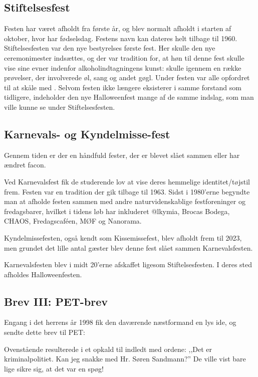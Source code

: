 \subsection{Stiftelsesfest}
Festen har været afholdt fra \TKETs første år, og blev normalt afholdt i starten af oktober, hvor \TKET har fødselsdag. Festens navn kan dateres helt tilbage til 1960. Stiftelsesfesten var den nye bestyrelses første fest. Her skulle den nye ceremonimester indsættes, og der var tradition for, at høn til denne fest skulle vise sine evner indenfor alkoholindtagningens kunst: \CERM skulle igennem en række prøvelser, der involverede øl, sang og andet gøgl. Under festen var alle opfordret til at skåle med \CERM. Selvom festen ikke længere eksisterer i samme forstand som tidligere, indeholder den nye Halloweenfest mange af de samme indslag, som man ville kunne se under Stiftelsesfesten.

\subsection{Karnevals- og Kyndelmisse-fest}
Gennem tiden er der en håndfuld fester, der er blevet slået sammen eller har ændret facon.

Ved Karnevalsfest fik de studerende lov at vise deres hemmelige identitet/tøjstil frem. Festen var en tradition der gik tilbage til 1963. Sidst i 1980'erne begyndte man at afholde festen sammen med andre naturvidenskablige festforeninger og fredagsbarer, hvilket i tidens løb har inkluderet @lkymia, Brocas Bodega, CHAOS, Fredagscaféen, MØF og Nanorama.

Kyndelmissefesten, også kendt som Kissemissefest, blev afholdt frem til 2023, men grundet det lille antal gæster blev denne fest slået sammen Karnevalsfesten.

Karnevalsfesten blev i midt 20'erne afskaffet ligesom Stiftelsesfesten. I deres sted afholdes Halloweenfesten.

\vfill
{}
\vfill

\newpage

\subsection{Brev III: PET-brev}
Engang i det herrens år 1998 fik den daværende næstformand en lys ide, og sendte
dette brev til PET:
\begin{figure}[H]
    \centering
\end{figure}

\noindent Ovenstående resulterede i et opkald til \TKET indledt med ordene: ,,Det er kriminalpolitiet. Kan jeg snakke med Hr. Søren Sandmann?'' De ville vist bare lige sikre sig, at det var en spøg!

